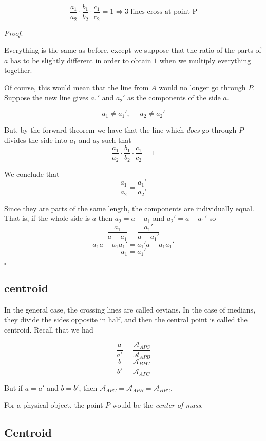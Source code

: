 \documentclass[11pt, oneside]{article}
\begin{document}
\[ \frac{a_1}{a_2} \cdot \frac{b_1}{b_2} \cdot  \frac{c_1}{c_2}  = 1 \iff \text{3 lines cross at point P} \]

\emph{Proof}.

Everything is the same as before, except we suppose that the ratio of the parts of $a$ has to be slightly different in order to obtain $1$ when we multiply everything together.

Of course, this would mean that the line from $A$ would no longer go through $P$.  Suppose the new line gives $a_1'$ and $a_2'$ as the components of the side $a$.

\[ a_1 \ne a_1', \ \ \ \ \ \  a_2 \ne a_2' \]

But, by the forward theorem we have that the line which \emph{does} go through $P$ divides the side into $a_1$ and $a_2$ such that
\[ \frac{a_1}{a_2} \cdot \frac{b_1}{b_2} \cdot  \frac{c_1}{c_2}  = 1 \]

We conclude that
\[ \frac{a_1}{a_2} = \frac{a_1'}{a_2'} \]

Since they are parts of the same length, the components are individually equal.  That is, if the whole side is $a$ then $a_2 = a - a_1$ and $a_2' = a - a_1'$ so
\[ \frac{a_1}{a - a_1} = \frac{a_1'}{a - a_1'} \]
\[ a_1 a - a_1 a_1' = a_1' a - a_1 a_1' \]
\[ a_1 = a_1' \]

$\square$

\subsection*{centroid}

In the general case, the crossing lines are called cevians.  In the case of medians, they divide the sides opposite in half, and then the central point is called the centroid.  Recall that we had

\[ \frac{a}{a'} = \frac{\mathcal{A}_{APC}}{\mathcal{A}_{APB}} \]
\[ \frac{b}{b'} = \frac{\mathcal{A}_{BPC}}{\mathcal{A}_{APC}} \]

But if $a = a'$ and $b = b'$, then $\mathcal{A}_{APC} = \mathcal{A}_{APB} = \mathcal{A}_{BPC}$.  

For a physical object, the point $P$ would be the \emph{center of mass}.

\subsection*{Centroid}

\label{sec:centroid_one_third}
\end{document}
